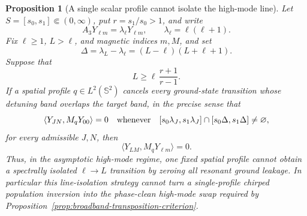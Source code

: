 \documentclass[11pt]{article}
\newtheorem{proposition}[theorem]{Proposition}
\theoremstyle{remark}
\begin{document}
\begin{proposition}[A single scalar profile cannot isolate the high-mode line]
\label{prop:single-carrier-high-mode-no-go}
Let $S=[s_0,s_1]\Subset(0,\infty)$, put $r=s_1/s_0>1$, and write
\[
 A_3Y_{\ell m}=\lambda_\ell Y_{\ell m},
 \qquad
 \lambda_\ell=\ell(\ell+1).
\]
Fix $\ell\geq1$, $L>\ell$, and magnetic indices $m,M$, and set
\[
 \Delta=\lambda_L-\lambda_\ell=(L-\ell)(L+\ell+1).
\]
Suppose that
\begin{equation}
 L\geq \ell\,\frac{r+1}{r-1}.
 \label{eq:single-carrier-high-mode-threshold}
\end{equation}
If a spatial profile $q\in L^2(\mathbb S^2)$ cancels every ground-state
transition whose detuning band overlaps the target band, in the precise sense
that
\begin{equation}
 \langle Y_{JN},M_qY_{00}\rangle=0
 \quad\hbox{whenever}\quad
 [s_0\lambda_J,s_1\lambda_J]\cap[s_0\Delta,s_1\Delta]\neq\varnothing,
 \label{eq:cancel-overlapping-ground-lines}
\end{equation}
for every admissible $J,N$, then
\begin{equation}
 \langle Y_{LM},M_qY_{\ell m}\rangle=0.
 \label{eq:target-line-also-cancelled}
\end{equation}
Thus, in the asymptotic high-mode regime, one fixed spatial profile cannot
obtain a spectrally isolated $\ell\to L$ transition by zeroing all resonant
ground leakage.  In particular this line-isolation strategy cannot turn a
single-profile chirped population inversion into the phase-clean high-mode
swap required by Proposition~\ref{prop:broadband-transposition-criterion}.
\end{proposition}
\end{document}
